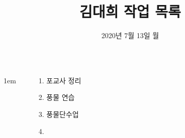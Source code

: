 \documentclass[25pt, a1paper ]{tikzposter}
\title{김대희 작업 목록 }
\author{ 2020년 7월 13일 월}
\begin{document}
	\maketitle

	\begin{columns}
			{
					\setlength{\leftmargini}{7em}
					\setlength{\labelsep} {1em}
				\begin{LARGE}
					\begin{itemize}
					\item [1.] 포교사 정리
					\item [2.] 풍물 연습
					\item [3.] 풍물단수업
					\item [4.] 
					\end{itemize}
				\end{LARGE}
			}







%





\end{columns}
\end{document}
